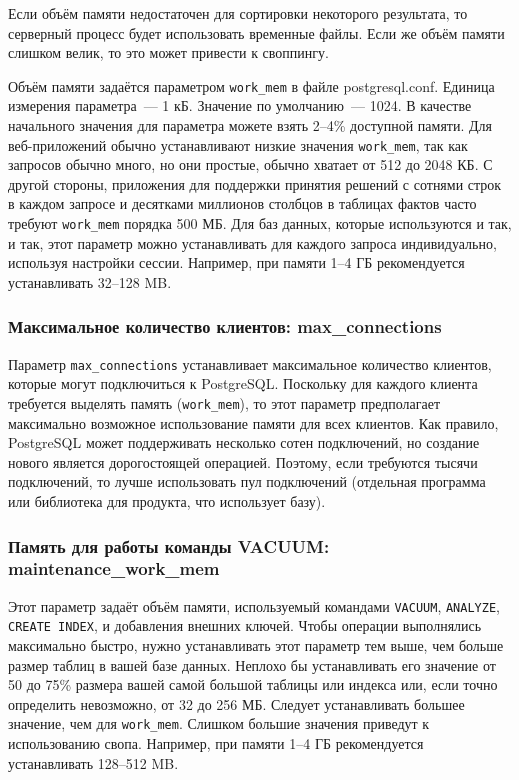 Если объём памяти недостаточен для сортировки некоторого результата, то серверный процесс будет использовать временные файлы. Если же объём памяти слишком велик, то это может привести к своппингу.

Объём памяти задаётся параметром \lstinline!work_mem! в файле postgresql.conf. Единица измерения параметра~--- 1 кБ. Значение по умолчанию~--- 1024. В качестве начального значения для параметра можете взять 2--4\% доступной памяти. Для веб-приложений обычно устанавливают низкие значения \lstinline!work_mem!, так как запросов обычно много, но они простые, обычно хватает от 512 до 2048 КБ. С другой стороны, приложения для поддержки принятия решений с сотнями строк в каждом запросе и десятками миллионов столбцов в таблицах фактов часто требуют \lstinline!work_mem! порядка 500 МБ. Для баз данных, которые используются и так, и так, этот параметр можно устанавливать для каждого запроса индивидуально, используя настройки сессии. Например, при памяти 1--4 ГБ рекомендуется устанавливать 32--128 MB.


\subsubsection{Максимальное количество клиентов: max\_connections}


Параметр \lstinline!max_connections! устанавливает максимальное количество клиентов, которые могут подключиться к PostgreSQL. Поскольку для каждого клиента требуется выделять память (\lstinline!work_mem!), то этот параметр предполагает максимально возможное использование памяти для всех клиентов. Как правило, PostgreSQL может поддерживать несколько сотен подключений, но создание нового является дорогостоящей операцией. Поэтому, если требуются тысячи подключений, то лучше использовать пул подключений (отдельная программа или библиотека для продукта, что использует базу).


\subsubsection{Память для работы команды VACUUM: maintenance\_work\_mem}


Этот параметр задаёт объём памяти, используемый командами \lstinline!VACUUM!, \lstinline!ANALYZE!, \lstinline!CREATE INDEX!, и добавления внешних ключей. Чтобы операции выполнялись максимально быстро, нужно устанавливать этот параметр тем выше, чем больше размер таблиц в вашей базе данных. Неплохо бы устанавливать его значение от 50 до 75\% размера вашей самой большой таблицы или индекса или, если точно определить невозможно, от 32 до 256 МБ. Следует устанавливать большее значение, чем для \lstinline!work_mem!. Слишком большие значения приведут к использованию свопа. Например, при памяти 1--4 ГБ рекомендуется устанавливать 128--512 MB.


